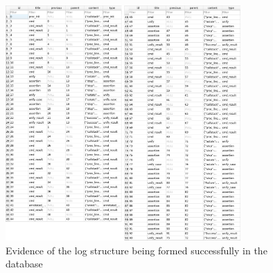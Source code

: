 \begin{figure}
  \center{}
  \includegraphics[width=0.8\textwidth]{img/log-structure-database.png}
  \caption{
    Evidence of the log structure being formed successfully in the database}%
  \label{fig:log-structure-database}
\end{figure}

